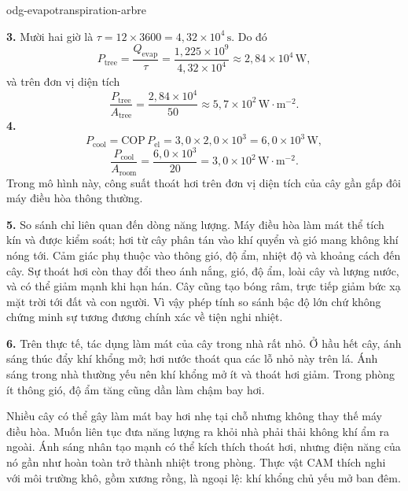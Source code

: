 \begin{exo}{odg-evapotranspiration-arbre}
\begin{solution}
\textbf{3.} Mười hai giờ là $\tau=12\times3600=4{,}32\times10^4\,\text{s}$. Do đó
\[
P_{\text{tree}}=\frac{Q_{\mathrm{evap}}}{\tau}
=\frac{1{,}225\times10^9}{4{,}32\times10^4}\approx2{,}84\times10^4\,\text{W},
\]
và trên đơn vị diện tích
\[
\frac{P_{\text{tree}}}{A_{\text{tree}}}
=\frac{2{,}84\times10^4}{50}\approx5{,}7\times10^2\,\text{W}\!\cdot\!\text{m}^{-2}.
\]
\textbf{4.}
\[
P_{\text{cool}}=\mathrm{COP}\,P_{\mathrm{el}}
=3{,}0\times2{,}0\times10^3=6{,}0\times10^3\,\text{W},
\]
\[
\frac{P_{\text{cool}}}{A_{\text{room}}}
=\frac{6{,}0\times10^3}{20}=3{,}0\times10^2\,\text{W}\!\cdot\!\text{m}^{-2}.
\]
Trong mô hình này, công suất thoát hơi trên đơn vị diện tích của cây gần gấp đôi máy điều hòa thông thường.

\textbf{5.} So sánh chỉ liên quan đến dòng năng lượng. Máy điều hòa làm mát thể tích kín và được kiểm soát; hơi từ cây phân tán vào khí quyển và gió mang không khí nóng tới. Cảm giác phụ thuộc vào thông gió, độ ẩm, nhiệt độ và khoảng cách đến cây. Sự thoát hơi còn thay đổi theo ánh nắng, gió, độ ẩm, loài cây và lượng nước, và có thể giảm mạnh khi hạn hán. Cây cũng tạo bóng râm, trực tiếp giảm bức xạ mặt trời tới đất và con người. Vì vậy phép tính so sánh bậc độ lớn chứ không chứng minh sự tương đương chính xác về tiện nghi nhiệt.

\textbf{6.} Trên thực tế, tác dụng làm mát của cây trong nhà rất nhỏ. Ở hầu hết cây, ánh sáng thúc đẩy khí khổng mở; hơi nước thoát qua các lỗ nhỏ này trên lá. Ánh sáng trong nhà thường yếu nên khí khổng mở ít và thoát hơi giảm. Trong phòng ít thông gió, độ ẩm tăng cũng dần làm chậm bay hơi.

Nhiều cây có thể gây làm mát bay hơi nhẹ tại chỗ nhưng không thay thế máy điều hòa. Muốn liên tục đưa năng lượng ra khỏi nhà phải thải không khí ẩm ra ngoài. Ánh sáng nhân tạo mạnh có thể kích thích thoát hơi, nhưng điện năng của nó gần như hoàn toàn trở thành nhiệt trong phòng. Thực vật CAM thích nghi với môi trường khô, gồm xương rồng, là ngoại lệ: khí khổng chủ yếu mở ban đêm.
\end{solution}
\end{exo}

